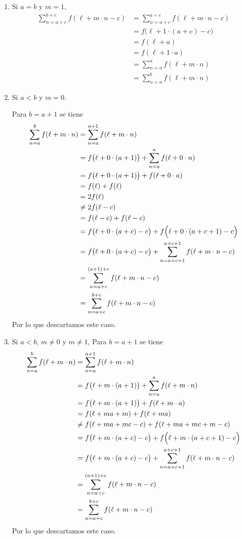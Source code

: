 \begin{enumerate}[label=\alph*)]
\begin{enumerate}[label=\Roman*)]
    \item Si $a=b$ y $m=1$,
    \begin{align*}
      \sum_{n=a+c}^{b+c} f(\ell+m\cdot n-c) &= \sum_{n=a+c}^{a+c} f(\ell+m\cdot n-c)\\
      &= f\bigl(\ell+1\cdot (a+c)-c\bigr)\\
      &= f(\ell + a)\\
      &= f(\ell+1\cdot a)\\
      &= \sum_{n=a}^a f(\ell+m\cdot n)\\
      &= \sum_{n=a}^b f(\ell+m\cdot n)
    \end{align*}

    \item Si $a<b$ y $m=0$.
    
    Para $b=a+1$ se tiene
    \begin{align*}
      \sum_{n=a}^b f(\ell+m\cdot n) &=\sum_{n=a}^{a+1} f(\ell+m\cdot n)\\
      &= f\bigl(\ell+0\cdot (a+1)\bigr) + \sum_{n=a}^{a} f(\ell+0\cdot n)\\
      &= f\bigl(\ell+0\cdot (a+1)\bigr) + f(\ell+0\cdot a)\\
      &= f(\ell) + f(\ell)\\
      &= 2 f(\ell)\\
      &\neq 2 f(\ell - c) \\
      &= f(\ell-c) + f(\ell-c)\\
      &= f\bigl(\ell+0\cdot (a+c)-c\bigr) + f\Bigl(\ell +0\cdot (a+c+1)-c\Bigr)\\
      &= f\bigl(\ell+0\cdot (a+c)-c\bigr) + \sum_{n=a+c+1}^{a+c+1} f(\ell+m\cdot n-c)\\
      &= \sum_{n=a+c}^{(a+1)+c} f(\ell+m\cdot n-c)\\
      &= \sum_{n=a+c}^{b+c} f(\ell+m\cdot n-c)
    \end{align*}
    Por lo que descartamos este caso.

    \item Si $a<b$, $m\neq 0$ y $m\neq 1$,
    Para $b=a+1$ se tiene
    \begin{align*}
      \sum_{n=a}^b f(\ell+m\cdot n) &=\sum_{n=a}^{a+1} f(\ell+m\cdot n)\\
      &= f\bigl(\ell+m\cdot (a+1)\bigr) + \sum_{n=a}^{a} f(\ell+m\cdot n)\\
      &= f\bigl(\ell+m\cdot (a+1)\bigr) + f(\ell+m\cdot a)\\
      &= f(\ell+ma+m) + f(\ell+ma)\\
      &\neq f(\ell+ma+mc-c) + f(\ell+ma+mc+m-c)\\
      &= f\bigl(\ell+m\cdot (a+c)-c\bigr) + f\Bigl(\ell +m\cdot (a+c+1)-c\Bigr)\\
      &= f\bigl(\ell+m\cdot (a+c)-c\bigr) + \sum_{n=a+c+1}^{a+c+1} f(\ell+m\cdot n-c)\\
      &= \sum_{n=a+c}^{(a+1)+c} f(\ell+m\cdot n-c)\\
      &= \sum_{n=a+c}^{b+c} f(\ell+m\cdot n-c)
    \end{align*}
    Por lo que descartamos este caso.


\end{enumerate}
\end{enumerate}
